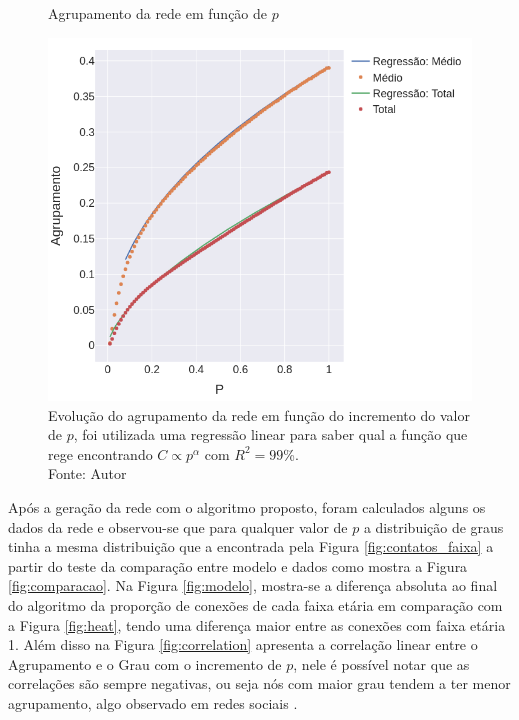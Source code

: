 \begin{figure}[H]
    \centering
    \captionsetup{font=normalsize,skip=0.8pt,singlelinecheck=on,labelsep=endash}
    \caption{Agrupamento da rede em função de $p$}
    \includegraphics[scale= 0.45]{figuras/clustering_vs_p.png}
    \captionsetup{font=small,justification=justified}    \caption*{Evolução do agrupamento da rede em função 
    do incremento do valor de $p$, foi utilizada uma regressão linear para saber qual a função que rege encontrando $C \propto p^{\alpha}$ com $R^2 = 99$\%.\\Fonte: Autor}
    \label{fig:regressao}
\end{figure}

Após a 
geração da rede com o algoritmo proposto, foram calculados alguns
os dados da rede e observou-se que para qualquer valor de $p$ a distribuição de graus tinha a mesma distribuição que a encontrada pela Figura \ref{fig:contatos_faixa} a partir do teste da comparação entre modelo e dados como mostra a Figura \ref{fig:comparacao}. 
Na Figura \ref{fig:modelo},
mostra-se a diferença absoluta ao final do algoritmo da proporção de conexões de cada faixa etária em comparação com a Figura \ref{fig:heat}, tendo uma diferença maior entre as conexões com faixa etária 1. Além disso na Figura \ref{fig:correlation} apresenta a correlação linear entre o Agrupamento e o Grau com o incremento de $p$, nele é possível notar que as correlações são sempre negativas, ou seja nós com maior grau tendem a ter 
menor agrupamento, algo observado em redes sociais \cite{Bok_nyi_2023}.

